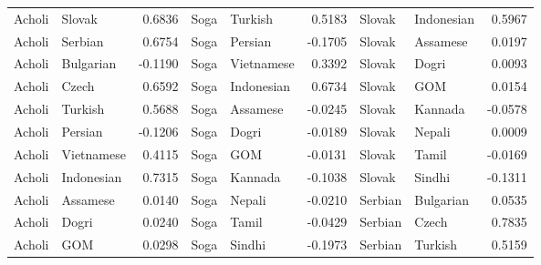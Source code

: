 \documentclass[11pt]{article} %
\begin{document}
\begin{table}
\begin{tabular}{llr@{\hspace{12pt}}llr@{\hspace{12pt}}llr}
            Acholi                       & Slovak              & 0.6836        & Soga                & Turkish             & 0.5183        & Slovak              & Indonesian          & 0.5967        \\
            Acholi                       & Serbian             & 0.6754        & Soga                & Persian             & -0.1705       & Slovak              & Assamese            & 0.0197        \\
            Acholi                       & Bulgarian           & -0.1190       & Soga                & Vietnamese          & 0.3392        & Slovak              & Dogri               & 0.0093        \\
            Acholi                       & Czech               & 0.6592        & Soga                & Indonesian          & 0.6734        & Slovak              & GOM                 & 0.0154        \\
            Acholi                       & Turkish             & 0.5688        & Soga                & Assamese            & -0.0245       & Slovak              & Kannada             & -0.0578       \\
            Acholi                       & Persian             & -0.1206       & Soga                & Dogri               & -0.0189       & Slovak              & Nepali              & 0.0009        \\
            Acholi                       & Vietnamese          & 0.4115        & Soga                & GOM                 & -0.0131       & Slovak              & Tamil               & -0.0169       \\
            Acholi                       & Indonesian          & 0.7315        & Soga                & Kannada             & -0.1038       & Slovak              & Sindhi              & -0.1311       \\
            Acholi                       & Assamese            & 0.0140        & Soga                & Nepali              & -0.0210       & Serbian             & Bulgarian           & 0.0535        \\
            Acholi                       & Dogri               & 0.0240        & Soga                & Tamil               & -0.0429       & Serbian             & Czech               & 0.7835        \\
            Acholi                       & GOM                 & 0.0298        & Soga                & Sindhi              & -0.1973       & Serbian             & Turkish             & 0.5159        \\

\end{tabular}
\end{table}
\end{document}
